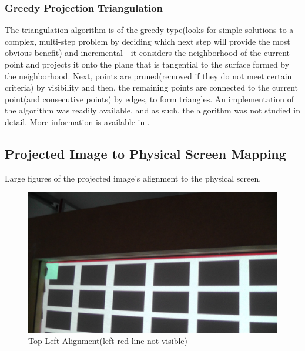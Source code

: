 \documentclass[]{article}
\begin{document}
\begin{appendices}
\subsubsection{Greedy Projection Triangulation}
\label{appendix:greedy}
 The triangulation algorithm is of the greedy type(looks for simple solutions to a complex, multi-step problem by deciding which next step will provide the most obvious benefit) and incremental - it considers the neighborhood of the current point and projects it onto the plane that is tangential to the surface formed by the neighborhood. Next, points are pruned(removed if they do not meet certain criteria) by visibility and then, the remaining points are connected to the current point(and consecutive points) by edges, to form triangles. An implementation of the algorithm was readily available, and as such, the algorithm was not studied in detail. More information is available in \cite{Marton09ICRA}.
\subsection{Projected Image to Physical Screen Mapping}
\label{appendix:B-alignment}
 
Large figures of the projected image's alignment to the physical screen.
 
 \begin{figure}[!hbtp]
    \centering
    \includegraphics[width=1.0\linewidth]{figures/TopLeft2.JPG} 
    \caption{Top Left Alignment(left red line not visible)} 
    \label{fig:TLA-big} 
 \end{figure}
 

\end{appendices}
\end{document}
